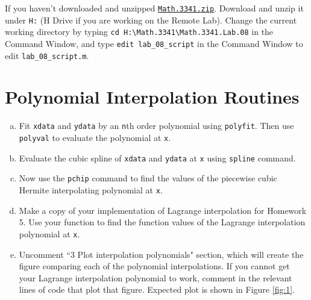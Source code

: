 If you haven't downloaded and unzipped \href{https://libaoj.in/courses/2021f/MATH3341/zip/Math.3341.zip}{\texttt{Math.3341.zip}}. Download and unzip it under \verb|H:| (H Drive if you are working on the Remote Lab). Change the current working directory by typing \verb|cd H:\Math.3341\Math.3341.Lab.08| in the Command Window, and type \verb|edit lab_08_script| in the Command Window to edit \verb|lab_08_script.m|.

\section{Polynomial Interpolation Routines}
\begin{enumerate}[(a)]
    \item Fit \verb|xdata| and \verb|ydata| by an \verb|n|th order polynomial using \verb|polyfit|. Then use \verb|polyval| to evaluate the polynomial at \verb|x|.
    \item Evaluate the cubic spline of \verb|xdata| and \verb|ydata| at \verb|x| using \verb|spline| command.
    \item Now use the \verb|pchip| command to find the values of the piecewise cubic Hermite interpolating polynomial at \verb|x|.
    \item Make a copy of your implementation of Lagrange interpolation for Homework 5. Use your function to find the function values of the Lagrange interpolation polynomial at \verb|x|.
    \item Uncomment ``3 Plot interpolation polynomials" section, which will create the figure comparing each of the polynomial interpolations. If you cannot get your Lagrange interpolation polynomial to work, comment in the relevant lines of code that plot that figure. Expected plot is shown in Figure \ref{fig:1}.
\end{enumerate}
